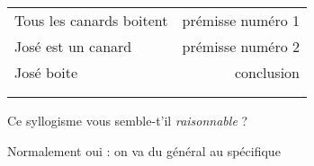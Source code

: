 \begin{frame}
	
\begin{tabular}{lr}
Tous les canards boitent & \hspace{2cm} prémisse numéro 1 \\
José est un canard & prémisse numéro 2 \\ \cline{1-1}
 José boite & conclusion\\ \\ \\
\end{tabular}

\pause

Ce syllogisme vous semble-t'il \textit{raisonnable} ? \pause \newline 

Normalement oui \pause : on va du général au spécifique%


%
%
%
%
%

\end{frame}




